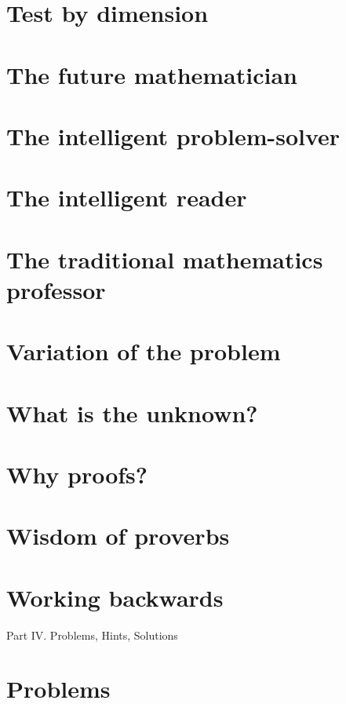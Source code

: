\documentclass[oneside]{book}
\numberwithin{equation}{section}
\begin{document}
\section{Test by dimension}

\section{The future mathematician}

\section{The intelligent problem-solver}

\section{The intelligent reader}

\section{The traditional mathematics professor}

\section{Variation of the problem}

\section{What is the unknown?}

\section{Why proofs?}

\section{Wisdom of proverbs}

\section{Working backwards}

\begin{center}
	\huge Part IV. Problems, Hints, Solutions
\end{center}

\section{Problems}
\end{document}
